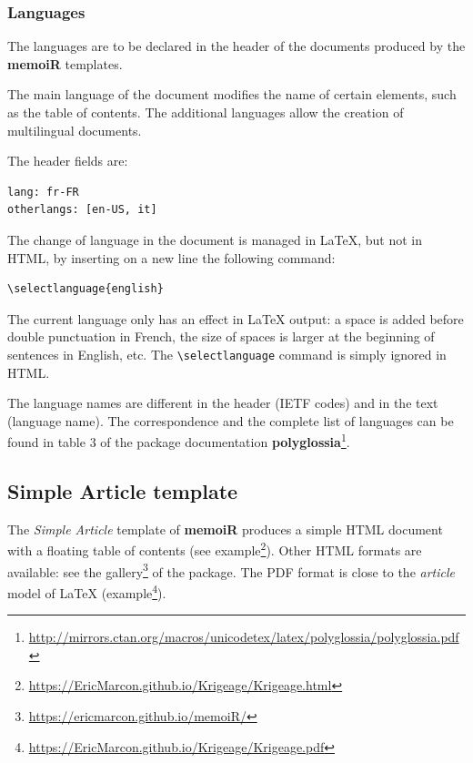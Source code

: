 \documentclass[
  12pt,
  american,
  a4paper,
  extrafontsizes,onecolumn,openright
  ]{memoir}
\begin{document}
\hypertarget{languages}{%
\subsubsection{Languages}\label{languages}}

The languages are to be declared in the header of the documents produced by the \textbf{memoiR} templates.

The main language of the document modifies the name of certain elements, such as the table of contents.
The additional languages allow the creation of multilingual documents.

The header fields are:

\begin{verbatim}
lang: fr-FR
otherlangs: [en-US, it]
\end{verbatim}

The change of language in the document is managed in LaTeX, but not in HTML, by inserting on a new line the following command:

\begin{verbatim}
\selectlanguage{english}
\end{verbatim}

The current language only has an effect in LaTeX output: a space is added before double punctuation in French, the size of spaces is larger at the beginning of sentences in English, etc.
The \texttt{\textbackslash{}selectlanguage} command is simply ignored in HTML.

The language names are different in the header (IETF codes) and in the text (language name).
The correspondence and the complete list of languages can be found in table 3 of the package documentation \textbf{polyglossia}\footnote{\url{http://mirrors.ctan.org/macros/unicodetex/latex/polyglossia/polyglossia.pdf}}.

\hypertarget{sec:memo}{%
\subsection{Simple Article template}\label{sec:memo}}

The \emph{Simple Article} template of \textbf{memoiR} produces a simple HTML document with a floating table of contents (see example\footnote{\url{https://EricMarcon.github.io/Krigeage/Krigeage.html}}).
Other HTML formats are available: see the gallery\footnote{\url{https://ericmarcon.github.io/memoiR/}} of the package.
The PDF format is close to the \emph{article} model of LaTeX (example\footnote{\url{https://EricMarcon.github.io/Krigeage/Krigeage.pdf}}).
\end{document}
